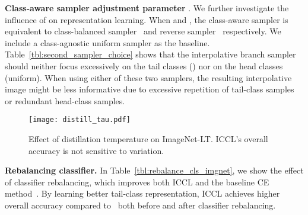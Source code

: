 \textbf{Class-aware sampler adjustment parameter }. 
We further investigate the influence of  on representation learning. 
When  and , the class-aware sampler is equivalent to class-balanced sampler~\cite{shen2016relay} 
and reverse sampler~\cite{bbn} respectively.
We include a class-agnostic uniform sampler as the baseline.
Table~\ref{tbl:second_sampler_choice} shows that the interpolative branch sampler should neither focus excessively on the 
tail classes () nor on the head classes (uniform). 
When using either of these two samplers,
the resulting interpolative image might be less informative due to 
excessive repetition of tail-class samples or redundant head-class samples.  

\begin{table}[!t]
	
	\centering
    \vspace{-1ex}
	\caption
		{\small	
		Effect of classifier rebalancing on ImageNet-LT. ICCL learns better tail-class representation which leads to higher tail-class (i.e. medium and few) accuracy after classifier rebalancing.
		}
	\label{tbl:rebalance_cls_imgnet}
\vspace{-2ex}
\end{table}	 \begin{figure}[!t]

	\centering
	\texttt{[image: distill\_tau.pdf]}
	\vspace{-1ex}

	\caption
	{ \small
		Effect of distillation temperature  on ImageNet-LT. ICCL's overall accuracy is not sensitive to  variation.
	} 
	\label{fig:distill_tau}
	\vspace{-3ex}
\end{figure}  
\textbf{Rebalancing classifier.} 
In Table~\ref{tbl:rebalance_cls_imgnet}, 
we show the effect of classifier rebalancing,
which improves both ICCL and the baseline CE method~\cite{decouple-longtail}.
By learning better tail-class representation, 
ICCL achieves higher overall accuracy compared to~\cite{decouple-longtail} both before and after classifier rebalancing. 




